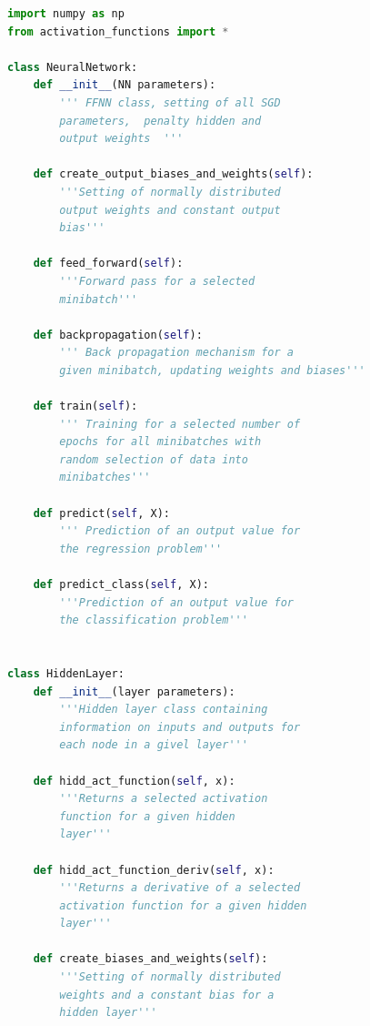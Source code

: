 \documentclass{emulateapj}
\begin{document}
\begin{lstlisting}[language=Python, caption={Structure of the NeuralNetwork and HiddenLayer classes.},label={lst:code_listing}]
import numpy as np
from activation_functions import *

class NeuralNetwork:
    def __init__(NN parameters):
        ''' FFNN class, setting of all SGD 
        parameters,  penalty hidden and 
        output weights  '''
        
    def create_output_biases_and_weights(self):
        '''Setting of normally distributed 
        output weights and constant output 
        bias'''
        
    def feed_forward(self):
        '''Forward pass for a selected 
        minibatch'''
        
    def backpropagation(self):
        ''' Back propagation mechanism for a 
        given minibatch, updating weights and biases'''
        
    def train(self):
        ''' Training for a selected number of 
        epochs for all minibatches with 
        random selection of data into 
        minibatches'''
        
    def predict(self, X):
        ''' Prediction of an output value for 
        the regression problem'''
        
    def predict_class(self, X):
        '''Prediction of an output value for 
        the classification problem'''


class HiddenLayer:
    def __init__(layer parameters):
        '''Hidden layer class containing 
        information on inputs and outputs for 
        each node in a givel layer'''
        
    def hidd_act_function(self, x):
        '''Returns a selected activation 
        function for a given hidden 
        layer'''
        
    def hidd_act_function_deriv(self, x):
        '''Returns a derivative of a selected 
        activation function for a given hidden 
        layer'''
        
    def create_biases_and_weights(self):
        '''Setting of normally distributed 
        weights and a constant bias for a 
        hidden layer'''
\end{lstlisting}
\end{document}
